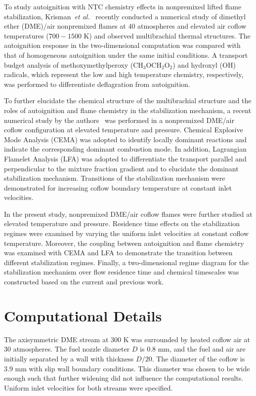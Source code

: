 \documentclass{wssci}
\begin{document}
To study autoignition with NTC chemistry effects in nonpremixed lifted flame stabilization, Krisman~\emph{et al.}~\cite{krisman14} recently conducted a numerical study of dimethyl ether (DME)/air nonpremixed flames at $40$ atmospheres and elevated air coflow temperatures ($700-1500$ K) and observed multibrachial thermal structures.  The autoignition response in the two-dimensional computation was compared with that of homogeneous autoignition under the same initial conditions.  A transport budget analysis of methoxymethylperoxy (CH$_3$OCH$_2$O$_2$) and hydroxyl (OH) radicals, which represent the low and high temperature chemistry, respectively, was performed to differentiate deflagration from autoignition.  

To further elucidate the chemical structure of the multibrachial structure and the roles of autoignition and flame chemistry in the stabilization mechanism, a recent numerical study by the authors~\cite{deng15} was performed in a nonpremixed DME/air coflow configuration at elevated temperature and pressure.  Chemical Explosive Mode Analysis (CEMA) was adopted to identify locally dominant reactions and indicate the corresponding dominant combustion mode.  In addition, Lagrangian Flamelet Analysis (LFA) was adopted to differentiate the transport parallel and perpendicular to the mixture fraction gradient and to elucidate the dominant stabilization mechanism.  Transitions of the stabilization mechanism were demonstrated for increasing coflow boundary temperature at constant inlet velocities.

In the present study, nonpremixed DME/air coflow flames were further studied at elevated temperature and pressure.  Residence time effects on the stabilization regimes were examined by varying the uniform inlet velocities at constant coflow temperature.  Moreover, the coupling between autoignition and flame chemistry was examined with CEMA and LFA to demonstrate the transition between different stabilization regimes.  Finally, a two-dimensional regime diagram for the stabilization mechanism over flow residence time and chemical timescales was constructed based on the current and previous work.                        

\section{Computational Details}

The axisymmetric DME stream at $300$ K was surrounded by heated coflow air at $30$ atmospheres.  The fuel nozzle diameter $D$ is $0.8$ mm, and the fuel and air are initially separated by a wall with thickness $D/20$.  The diameter of the coflow is $3.9$ mm with slip wall boundary conditions.  This diameter was chosen to be wide enough such that further widening did not influence the computational results.  Uniform inlet velocities for both streams were specified.
\end{document}
